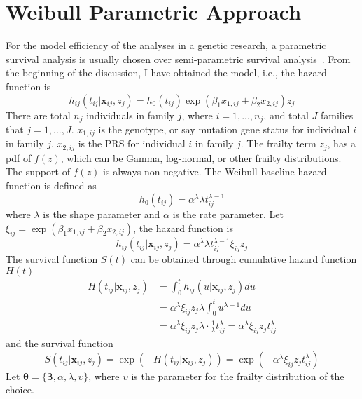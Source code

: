 \documentclass[preprint,12pt]{elsarticle}
\begin{document}
\section{Weibull Parametric Approach}
For the model efficiency of the analyses in a genetic research, a parametric survival analysis is usually chosen over semi-parametric survival analysis~\cite{rudolph2018parametric, berger2001statistical}.
From the beginning of the discussion, I have obtained the model, i.e., the hazard function is
\begin{equation}
    h_{ij}(t_{ij}|\mathbf{x}_{ij}, z_j)=h_0(t_{ij})\exp(\beta_1x_{1,ij}+\beta_2 x_{2,ij})z_j
\end{equation}
There are total $n_j$ individuals in family $j$, where $i=1,...,n_j$, and total $J$ families that $j=1,...,J$. $x_{1,ij}$ is the genotype, or say mutation gene status for individual $i$ in family $j$. $x_{2,ij}$
is the PRS for individual $i$ in family $j$. The frailty term $z_j$, has a pdf of $f(z)$, which can be Gamma, log-normal, or other frailty distributions.
The support of $f(z)$ is always non-negative. The Weibull baseline hazard function is defined as
\begin{equation}
    h_0(t_{ij})=\alpha^{\lambda}\lambda t_{ij}^{\lambda-1}
\end{equation}
where $\lambda$ is the shape parameter and $\alpha$ is the rate parameter. Let $\xi_{ij}=\exp(\beta_1 x_{1,ij}+\beta_2 x_{2,ij})$, the hazard function is 
\begin{equation}
    h_{ij}(t_{ij}|\mathbf{x}_{ij}, z_j)=\alpha^{\lambda}\lambda t_{ij}^{\lambda-1}\xi_{ij}z_j
\end{equation}
The survival function $S(t)$ can be obtained through cumulative hazard function $H(t)$
\begin{align}
    H(t_{ij}|\mathbf{x}_{ij}, z_j)&=\int_0^{t}h_{ij}(u|\mathbf{x}_{ij}, z_j)du\\
    &=\alpha^{\lambda}\xi_{ij}z_j\lambda\int_0^t u^{\lambda-1}du\\
    &=\alpha^{\lambda}\xi_{ij}z_j\lambda\cdot \frac{1}{\lambda} t_{ij}^{\lambda}=\alpha^{\lambda}\xi_{ij}z_j t_{ij}^{\lambda}
\end{align}
and the survival function
\begin{equation}
    S(t_{ij}|\mathbf{x}_{ij}, z_j)=\exp(-H(t_{ij}|\mathbf{x}_{ij}, z_j))=\exp(-\alpha^{\lambda}\xi_{ij}z_j t_{ij}^{\lambda})
\end{equation}
Let $\boldsymbol{\theta}=\{\boldsymbol{\beta}, \alpha, \lambda, \upsilon\}$, where $\upsilon$ is the parameter for the frailty distribution of the choice. 
\end{document}
